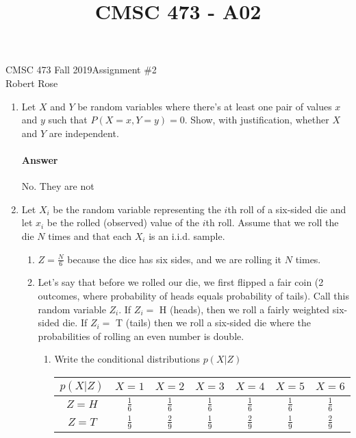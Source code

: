 \documentclass[12pt]{article}
\title{CMSC 473 - A02}
\begin{document}
CMSC 473 Fall 2019\hfill Assignment \#2\\
Robert Rose

\hrulefill

\begin{enumerate}
\item Let $X$ and $Y$ be random variables where there's at least one pair of values $x$ and $y$
      such that $P(X = x, Y = y) = 0$. Show, with justification, whether $X$ and $Y$ are independent.
    \paragraph{Answer} No. They are not 
\item Let $X_i$ be the random variable representing the $i$th roll of a six-sided die
      and let $x_i$ be the rolled (observed) value of the $i$th roll. Assume that we
      roll the die $N$ times and that each $X_i$ is an i.i.d. sample.
  \begin{enumerate}
  \item $Z = \frac{N}{6}$ because the dice has six sides, and we are rolling it $N$ times.
  \item Let's say that before we rolled our die, we first flipped a fair coin (2 outcomes, where
        probability of heads equals probability of tails). Call this random variable $Z_i$. 
        If $Z_i =$ H (heads), then we roll a fairly weighted six-sided die. If $Z_i =$ T (tails)
        then we roll a six-sided die where the probabilities of rolling an even number is
        double.
        \begin{enumerate}
            \item Write the conditional distributions $p(X|Z)$
                \begin{center}
                \begin{tabular}{ |c|c|c|c|c|c|c| }
                    \hline
                    $p(X|Z)$ & $X = 1$ & $X = 2$ & $X = 3$ & $X = 4$ & $X = 5$ & $X = 6$ \\
                    \hline
                    $Z = H$ & $\frac{1}{6}$ & $\frac{1}{6}$ & $\frac{1}{6}$ & $\frac{1}{6}$ & $\frac{1}{6}$ & $\frac{1}{6}$ \\
                    \hline
                    $Z = T$ & $\frac{1}{9}$ & $\frac{2}{9}$ & $\frac{1}{9}$ & $\frac{2}{9}$ & $\frac{1}{9}$ & $\frac{2}{9}$ \\
                    \hline
                \end{tabular}
                \end{center}

\end{enumerate}
\end{enumerate}
\end{enumerate}
\end{document}

